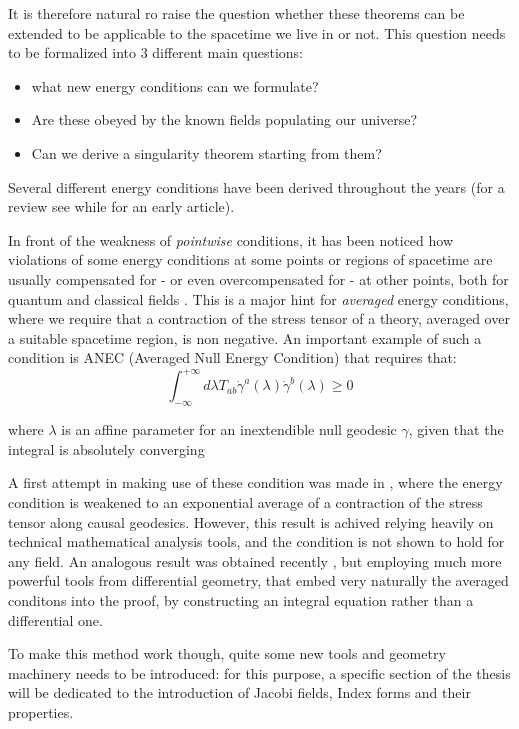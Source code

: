\documentclass[12pt, a4paper]{article}
\begin{document}
It is therefore natural ro raise the question whether these theorems can be extended to be applicable to the spacetime we live in or not. This question needs to be formalized into \(3\) different main questions:
\begin{itemize}
	\item what new energy conditions can we formulate?
	\item Are these obeyed by the known fields populating our universe?
	\item  Can we derive a singularity theorem starting from them?
\end{itemize}
Several different energy conditions have been derived throughout the years (for a review see \cite{kontou2020energy} while \cite{tipler1978energy} for an early article).

In front of the weakness of \emph{pointwise} conditions, it has been noticed how violations of some energy conditions at some points or regions of spacetime are usually compensated for - or even overcompensated for - at other points, both for quantum and classical fields \cite{ford1999quantum}.
This is a major hint for \emph{averaged} energy conditions, where we require that a contraction of the stress tensor of a theory, averaged over a suitable spacetime region, is non negative.
An important example of such a condition is ANEC (Averaged Null Energy Condition) that requires that:
\[
\int_{-\infty}^{+\infty} d\lambda T_{ab} \dot{\gamma}^a(\lambda) \dot{\gamma}^b(\lambda) \ge 0
\]

where \(\lambda\) is an affine parameter for an inextendible null geodesic \(\gamma\), given that the integral is absolutely converging

A first attempt in making use of these condition was made in \cite{fewster2011singularity},
where the energy condition is weakened to an exponential average of a contraction of the stress tensor along causal geodesics.
However, this result is achived relying heavily on technical mathematical analysis tools, and the condition is not shown to hold for any field.
An analogous result was obtained recently \cite{fewster2020new}, but employing much more powerful tools from differential geometry, that embed very naturally the averaged conditons into the proof, by constructing an integral equation rather than a differential one.

To make this method work though, quite some new tools and geometry machinery needs to be introduced: for this purpose, a specific section of the thesis will be dedicated to the introduction of Jacobi fields, Index forms and their properties.
\end{document}

